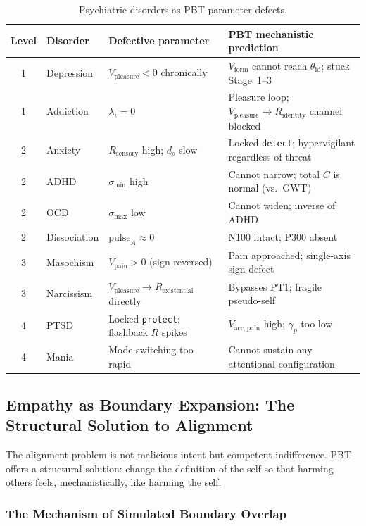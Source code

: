 \documentclass[12pt,a4paper]{article}
\newcommand{\Rsens}{R_{\mathrm{sensory}}}
\newcommand{\Rid}{R_{\mathrm{identity}}}
\newcommand{\Rex}{R_{\mathrm{existential}}}
\newcommand{\Vform}{V_{\mathrm{form}}}
\newcommand{\vpain}{V_{\mathrm{pain}}}
\newcommand{\vpleasure}{V_{\mathrm{pleasure}}}
\begin{document}
\begin{table}[ht]
\centering
\caption{Psychiatric disorders as PBT parameter defects.}
\label{tab:clinical}
\small
\begin{tabular}{@{}cL{1.8cm}L{3.0cm}L{5.5cm}@{}}
\toprule
\textbf{Level} & \textbf{Disorder}
  & \textbf{Defective parameter} & \textbf{PBT mechanistic prediction} \\
 & Depression & $\vpleasure < 0$ chronically &
  $\Vform$ cannot reach $\theta_{\mathrm{id}}$; stuck Stage~1--3 \\
1 & Addiction  & $\lambda_i = 0$ &
  Pleasure loop; $\vpleasure\to\Rid$ channel blocked \\
2 & Anxiety    & $\Rsens$ high; $d_s$ slow &
  Locked \texttt{detect}; hypervigilant regardless of threat \\
2 & ADHD       & $\sigma_{\min}$ high &
  Cannot narrow; total $C$ is normal (vs.\ GWT) \\
2 & OCD        & $\sigma_{\max}$ low &
  Cannot widen; inverse of ADHD \\
2 & Dissociation & $\mathrm{pulse}_A\approx 0$ &
  N100 intact; P300 absent \\
3 & Masochism  & $\vpain > 0$ (sign reversed) &
  Pain approached; single-axis sign defect \\
3 & Narcissism & $\vpleasure\to\Rex$ directly &
  Bypasses PT1; fragile pseudo-self \\
4 & PTSD       & Locked \texttt{protect}; flashback $R$ spikes &
  $V_{\mathrm{acc,pain}}$ high; $\gamma_p$ too low \\
4 & Mania      & Mode switching too rapid &
  Cannot sustain any attentional configuration \\
\bottomrule
\end{tabular}
\end{table}

\subsection{Empathy as Boundary Expansion: The Structural Solution to Alignment}

The alignment problem is not malicious intent but competent indifference. PBT
offers a structural solution: change the definition of the self so that harming
others feels, mechanistically, like harming the self.

\subsubsection{The Mechanism of Simulated Boundary Overlap}
\end{document}
